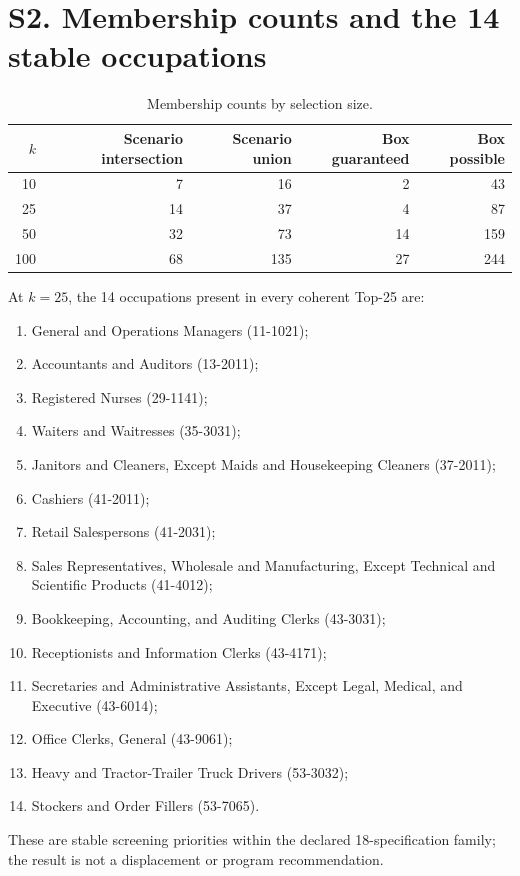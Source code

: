 \documentclass[10pt]{article}
\begin{document}
\section*{S2. Membership counts and the 14 stable occupations}
\begin{table}[h]\centering\small
\caption{Membership counts by selection size.}
\begin{tabular}{rrrrr}\toprule $k$&Scenario intersection&Scenario union&Box guaranteed&Box possible\\\midrule
10&7&16&2&43\\25&14&37&4&87\\50&32&73&14&159\\100&68&135&27&244\\\bottomrule\end{tabular}
\end{table}

At $k=25$, the 14 occupations present in every coherent Top-25 are:
\begin{enumerate}\small
\item General and Operations Managers (11-1021);
\item Accountants and Auditors (13-2011);
\item Registered Nurses (29-1141);
\item Waiters and Waitresses (35-3031);
\item Janitors and Cleaners, Except Maids and Housekeeping Cleaners (37-2011);
\item Cashiers (41-2011);
\item Retail Salespersons (41-2031);
\item Sales Representatives, Wholesale and Manufacturing, Except Technical and Scientific Products (41-4012);
\item Bookkeeping, Accounting, and Auditing Clerks (43-3031);
\item Receptionists and Information Clerks (43-4171);
\item Secretaries and Administrative Assistants, Except Legal, Medical, and Executive (43-6014);
\item Office Clerks, General (43-9061);
\item Heavy and Tractor-Trailer Truck Drivers (53-3032);
\item Stockers and Order Fillers (53-7065).
\end{enumerate}
These are stable screening priorities within the declared 18-specification family; the result is not a displacement or program recommendation.
\end{document}
